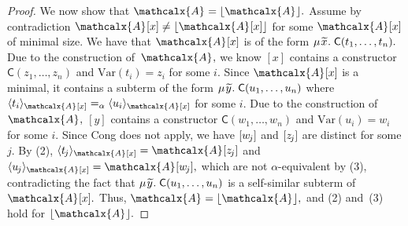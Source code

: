 \documentclass[smallcondensed,draft]{svjour3}
\newcommand\MU{\vvthinspace\mu\vvthinspace}
\newcommand\const[1]{\textsf{#1}}
\newcommand{\Ec}{E}
\newcommand{\rn}[1]{\textsf{#1}}
\newcommand{\expand}[2]{\langle \smash{#2} \rangle_{#1}}
\newcommand{\ec}[1]{[#1]}
\newcommand{\Val}{\mathcalx{A}\vvthinspace}
\newcommand{\Varec}[1]{\vvthinspace\widetilde{#1}\vvthinspace}
\newcommand{\nf}[1]{\lfloor#1\rfloor}
\newcommand{\aequiv}{\mathrel{=_\alpha}}
\newcommand{\muvar}{\mathrm{Var}} %
\newcommand\vvthinspace{\kern+0.041667em}
\newcommand\negvthinspace{\kern-0.083333em}
\begin{document}
\begin{proof}
We now show that $\Val = \nf{\Val}.$
Assume by contradiction $\Val \ec{x} \neq \nf{\Val \ec{x}}$ for some $\Val \ec{x}$ of minimal size.
We have that $\Val \ec{x}$ is of the form $\MU {\Varec{x}}.\; \const{C}( t_1, \ldots, t_n ).$
Due to the construction of~$\Val,$
we know $\ec{x}$ contains a constructor $\const{C}( z_1, \ldots, z_n )$ and $\muvar( t_i ) = z_i$ for some $i.$ %
Since $\Val \ec{x}$ is a minimal, it
contains a subterm of the form $\MU {\Varec{y}}.\; \const{C}( u_1, \ldots, u_n )$
where $\expand{\Val \ec{x}}{ t_i } \aequiv \expand{\Val \ec{x} }{ u_i }$ for some $i.$ %
Due to the construction of $\Val,$ $\ec{y}$ contains a constructor $\const{C}( w_1, \ldots, w_n )$ and $\muvar( u_i ) = w_i$ for some $i.$ %
Since \rn{Cong} does not apply, %
we have $\ec{w_{\negvthinspace j}}$ and $\ec{z_{\negvthinspace j}}$ are distinct for some $j.$
By (2), $\expand{\Val \ec{x}}{ t_{\negvthinspace j} } = \Val \ec{z_{\negvthinspace j}}$
and $\expand{\Val \ec{x}}{ u_{\negvthinspace j} } = \Val \ec{w_{\negvthinspace j}},$
which are not $\alpha$-equivalent by (3), contradicting the fact that $\MU {\Varec{y}}.\; \const{C}( u_1, \ldots, u_n )$ is a self-similar subterm of $\Val \ec{x}.$
Thus, $\Val = \nf{\Val},$ and (2) and~(3) hold for $\nf{\Val}.$


\end{proof}
\end{document}

